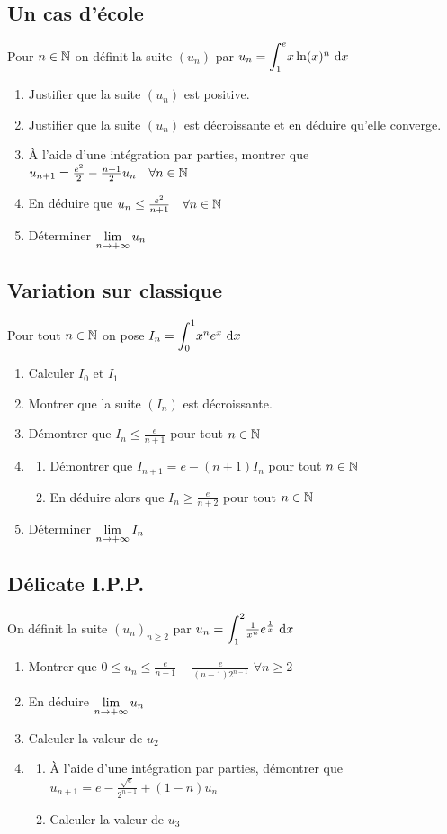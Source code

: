 \documentclass[oneside,12pt]{book}          %
\begin{document}
\subsection{Un cas d'école}
Pour ${n\in\mathbb N}$ on définit la suite $(u_n)$ par $u_n={\displaystyle\int_{1}^{e}}x\ln(x)^n{\,\,\mathrm{d}} x$
\begin{enumerate}
    \item Justifier que la suite $(u_n)$ est positive.
    \item Justifier que la suite $(u_n)$ est décroissante et en déduire qu'elle converge.
    \item À l'aide d'une intégration par parties, montrer que $u_{n+1}=\frac{e^2}{2}-\frac{n+1}{2}u_n\quad\forall{n\in\mathbb N}$
    \item En déduire que $u_n\leq\frac{e^2}{n+1}\quad\forall{n\in\mathbb N}$
    \item Déterminer ${\lim\limits_{n\to +\infty}}\, u_n$
\end{enumerate}



\subsection{Variation sur classique}
Pour tout ${n\in\mathbb N}$ on pose $I_n={\displaystyle\int_{0}^{1}}x^ne^x{\,\,\mathrm{d}} x$
\begin{enumerate}
    \item Calculer $I_0$ et $I_1$
    \item Montrer que la suite $(I_n)$ est décroissante.
    \item Démontrer que $I_n \leq \frac{e}{n+1}$ \quad pour tout ${n\in\mathbb N}$
    \item \begin{enumerate}
    	\item Démontrer que $I_{n+1}=e-(n+1)I_n$ \quad pour tout ${n\in\mathbb N}$
    	\item En déduire alors que $I_n\geq \frac{e}{n+2}$ \quad pour tout ${n\in\mathbb N}$
	\end{enumerate}
    \item Déterminer ${\lim\limits_{n\to +\infty}}\, I_n$
\end{enumerate}



\subsection{Délicate I.P.P.}
On définit la suite $(u_n)_{n\geq2}$ par $u_n={\displaystyle\int_{1}^{2}}\frac{1}{x^n}e^{\frac{1}{x}}{\,\,\mathrm{d}} x$
\begin{enumerate}
	\item Montrer que $0\leq u_n \leq \frac{e}{n-1}-\frac{e}{(n-1)2^{n-1}}$ \quad $\forall n\geq2$
	\item En déduire ${\lim\limits_{n\to +\infty}}\, u_n$
	\item Calculer la valeur de $u_2$
	\item \begin{enumerate}
		\item À l'aide d'une intégration par parties, démontrer que $u_{n+1}=e-\frac{\sqrt{e}}{2^{n-1}}+(1-n)u_n$
		\item Calculer la valeur de $u_3$
	\end{enumerate}
\end{enumerate}
\end{document}
